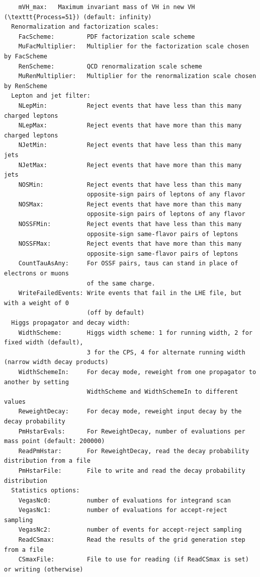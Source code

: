 \documentclass[aps,superscriptaddress,nofootinbib]{revtex4}
\begin{document}
\begin{verbatim}
    mVH_max:   Maximum invariant mass of VH in new VH (\texttt{Process=51}) (default: infinity)
  Renormalization and factorization scales:
    FacScheme:         PDF factorization scale scheme
    MuFacMultiplier:   Multiplier for the factorization scale chosen by FacScheme
    RenScheme:         QCD renormalization scale scheme
    MuRenMultiplier:   Multiplier for the renormalization scale chosen by RenScheme
  Lepton and jet filter:
    NLepMin:           Reject events that have less than this many charged leptons
    NLepMax:           Reject events that have more than this many charged leptons
    NJetMin:           Reject events that have less than this many jets
    NJetMax:           Reject events that have more than this many jets
    NOSMin:            Reject events that have less than this many
                       opposite-sign pairs of leptons of any flavor
    NOSMax:            Reject events that have more than this many
                       opposite-sign pairs of leptons of any flavor
    NOSSFMin:          Reject events that have less than this many
                       opposite-sign same-flavor pairs of leptons
    NOSSFMax:          Reject events that have more than this many
                       opposite-sign same-flavor pairs of leptons
    CountTauAsAny:     For OSSF pairs, taus can stand in place of electrons or muons
                       of the same charge.
    WriteFailedEvents: Write events that fail in the LHE file, but with a weight of 0
                       (off by default)
  Higgs propagator and decay width:
    WidthScheme:       Higgs width scheme: 1 for running width, 2 for fixed width (default),
                       3 for the CPS, 4 for alternate running width (narrow width decay products)
    WidthSchemeIn:     For decay mode, reweight from one propagator to another by setting
                       WidthScheme and WidthSchemeIn to different values
    ReweightDecay:     For decay mode, reweight input decay by the decay probability
    PmHstarEvals:      For ReweightDecay, number of evaluations per mass point (default: 200000)
    ReadPmHstar:       For ReweightDecay, read the decay probability distribution from a file
    PmHstarFile:       File to write and read the decay probability distribution
  Statistics options:
    VegasNc0:          number of evaluations for integrand scan
    VegasNc1:          number of evaluations for accept-reject sampling
    VegasNc2:          number of events for accept-reject sampling
    ReadCSmax:         Read the results of the grid generation step from a file
    CSmaxFile:         File to use for reading (if ReadCSmax is set) or writing (otherwise)

\end{verbatim}
\end{document}
